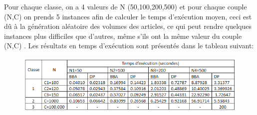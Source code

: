 \documentclass[12pt]{article}
\begin{document}
Pour chaque classe, on a 4 valeurs de N (50,100,200,500) et pour chaque couple (N,C) on prends 5 instances afin de calculer le temps d'exécution moyen, ceci est dû à la génération aléatoire des volumes des articles, ce qui peut rendre quelques instances plus difficiles que d’autres, même s’ils ont la même valeur du couple (N,C) . Les résultats en temps d'exécution sont présentés dans le tableau suivant:
\begin{figure}[H]
    \includegraphics[width=13.5cm]{../figures/tab2.png}
\end{figure}
\end{document}
